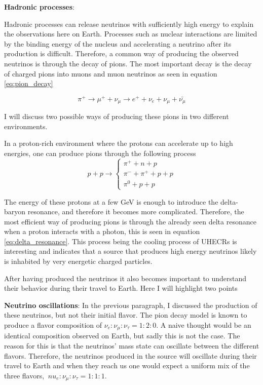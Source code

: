 \textbf{Hadronic processes}:

Hadronic processes can release neutrinos with sufficiently high energy to explain the observations here on Earth. 
Processes such as nuclear interactions are limited by the binding energy of the nucleus and accelerating a neutrino after its production is difficult.
Therefore, a common way of producing the observed neutrinos is through the decay of pions. The most important decay is the decay of charged pions into muons and muon neutrinos as seen in equation \ref{eq:pion_decay}


\begin{equation}
    \pi^+ \rightarrow \mu^+ + \nu_\mu \rightarrow e^+ + \nu_e + \nu_\mu + \bar{\nu_\mu}
    \label{eq:pion_decay}
\end{equation}

I will discuss two possible ways of producing these pions in two different environments. 


In a proton-rich environment where the protons can accelerate up to high energies, one can produce pions through the following process
\begin{equation}
    p + p \rightarrow \begin{cases}
        \pi^+ + n+ p \\
        \pi^- + \pi^+ +p + p  \\
        \pi^0 + p+p
    \end{cases}
\end{equation}

The energy of these protons at a few GeV is enough to introduce the delta-baryon resonance, and therefore it becomes more complicated.
Therefore, the most efficient way of producing pions is through the already seen delta resonance when a proton interacts with a photon, this is seen in equation \ref{eq:delta_resonance}.
This process being the cooling process of UHECRs is interesting and indicates that a source that produces high energy neutrinos likely is inhabited by very energetic charged particles. 

After having produced the neutrinos it also becomes important to understand their behavior during their travel to Earth. Here I will highlight two points


\textbf{Neutrino oscillations}:
In the previous paragraph, I discussed the production of these neutrinos, but not their initial flavor.
The pion decay model is known to produce a flavor composition of $\nu_e : \nu_\mu : \nu_\tau = 1:2:0$. 
A naive thought would be an identical composition observed on Earth, but sadly this is not the case. 
The reason for this is that the neutrinos' mass state can oscillate between the different flavors. Therefore, the neutrinos produced in the source will oscillate during their travel to Earth and when they reach us one would expect a 
uniform mix of the three flavors, $\ nu_e: \nu_\mu: \nu_\tau = 1:1:1$.

